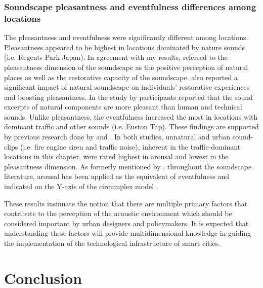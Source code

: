 \subsubsection*{Soundscape pleasantness and eventfulness differences among locations}

The pleasantness and eventfulness were significantly different among locations. Pleasantness appeared to be highest in locations dominated by nature sounds (i.e. Regents Park Japan). In agreement with my results, \citet{Payne2013production} referred to the pleasantness dimension of the soundscape as the positive perception of natural places as well as the restorative capacity of the soundscape. \citet{Zhang2014Research} also reported a significant impact of natural soundscape on individuals' restorative experiences and boosting pleasantness. In the study by \citet{Axelsson2010principal} participants reported that the sound excerpts of natural components are more pleasant than human and technical sounds. Unlike pleasantness, the eventfulness increased the most in locations with dominant traffic and other sounds (i.e. Euston Tap). These findings are supported by previous research done by \citet{Bradley2000Emotion} and \citet{Hume2013Physiological}. In both studies, unnatural and urban sound-clips (i.e. fire engine siren and traffic noise), inherent in the traffic-dominant locations in this chapter, were rated highest in arousal and lowest in the pleasantness dimension. As formerly mentioned by \citet{Erfanian2019Psychophysiological}, throughout the soundscape literature, arousal has been applied as the equivalent of eventfulness and indicated on the Y-axis of the circumplex model \citep{Axelsson2010principal,Erfanian2019Psychophysiological}.

These results insinuate the notion that there are multiple primary factors \citep{Bradley2000Emotion} that contribute to the perception of the acoustic environment which should be considered important by urban designers and policymakers. It is expected that understanding these factors will provide multidimensional knowledge in guiding the implementation of the technological infrastructure of smart cities.


\section{Conclusion}

